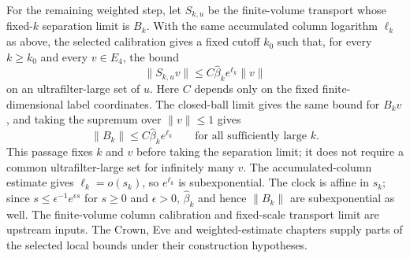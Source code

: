For the remaining weighted step, let $S_{k,u}$ be the finite-volume
transport whose fixed-$k$ separation limit is $B_k$. With the same
accumulated column logarithm $\ell_k$ as above, the selected calibration
gives a fixed cutoff $k_0$ such that, for every $k\ge k_0$
and every $v\in E_4$, the bound
\[
 \|S_{k,u}v\|\le C\widehat\beta_k e^{\ell_k}\|v\|
\]
on an ultrafilter-large set of $u$. Here $C$ depends only on the fixed
finite-dimensional label coordinates. The closed-ball limit gives the
same bound for $B_kv$, and taking the supremum over $\|v\|\le1$ gives
\begin{equation}
 \|B_k\|\le C\widehat\beta_k e^{\ell_k}
 \qquad\text{for all sufficiently large }k.
 \label{eq:ex-branch-transport-bound}
\end{equation}
This passage fixes $k$ and $v$ before taking the separation limit; it does not require a common
ultrafilter-large set for infinitely many $v$. The accumulated-column estimate gives $\ell_k=o(s_k)$, so $e^{\ell_k}$ is
subexponential. The clock is affine in $s_k$; since
$s\le\epsilon^{-1}e^{\epsilon s}$ for $s\ge0$ and $\epsilon>0$,
$\widehat\beta_k$ and hence $\|B_k\|$ are subexponential as well. The
finite-volume column calibration and fixed-scale transport limit are upstream
inputs. The Crown, Eve and weighted-estimate chapters supply parts of the
selected local bounds under their construction hypotheses.

